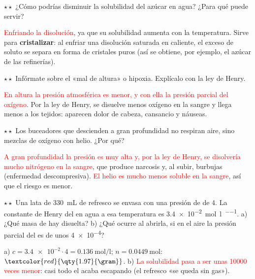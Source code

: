 \begin{exercise}
    \(\star\star\) ¿Cómo podrías disminuir la solubilidad del azúcar en agua? ¿Para qué puede servir?
    \begin{solu}
        \textcolor{red}{Enfriando la disolución}, ya que su solubilidad aumenta con la temperatura. Sirve para \textbf{cristalizar}:
        al enfriar una disolución saturada en caliente, el exceso de soluto se separa en forma de cristales puros (así se obtiene,
        por ejemplo, el azúcar de las refinerías).
    \end{solu}
\end{exercise}

\begin{exercise}
    \(\star\star\) Infórmate sobre el «mal de altura» o hipoxia. Explícalo con la ley de Henry.
    \begin{solu}
        \textcolor{red}{En altura la presión atmosférica es menor, y con ella la presión parcial del oxígeno}. Por la ley de Henry,
        se disuelve menos oxígeno en la sangre y llega menos a los tejidos: aparecen dolor de cabeza, cansancio y náuseas.
    \end{solu}
\end{exercise}

\begin{exercise}
    \(\star\star\) Los buceadores que descienden a gran profundidad no respiran aire, sino mezclas de oxígeno con helio. ¿Por qué?
    \begin{solu}
        \textcolor{red}{A gran profundidad la presión es muy alta y, por la ley de Henry, se disolvería mucho nitrógeno en la
        sangre}, que produce narcosis y, al subir, burbujas (enfermedad descompresiva). \textcolor{red}{El helio es mucho menos
        soluble en la sangre}, así que el riesgo es menor.
    \end{solu}
\end{exercise}

\begin{exercise}
    \(\star\star\) Una lata de \qty{330}{\mL} de refresco se envasa con una presión de  de \qty{4}{\atm}. La constante de
    Henry del  en agua a esa temperatura es \qty{3.4e-2}{\mol\per\litre\per\atm}. a) ¿Qué masa de  hay disuelta?
    b) ¿Qué ocurre al abrirla, si en el aire la presión parcial del  es de unos \qty{4e-4}{\atm}?
    \begin{solu}
        a) \(c = \num{3.4e-2} \cdot 4 = \qty{0.136}{\mol\per\litre}\); \(n = \qty{0.0449}{\mol}\): \(\textcolor{red}{\qty{1.97}{\gram}}\).
        b) \textcolor{red}{La solubilidad pasa a ser unas \num{10000} veces menor}: casi todo el  acaba escapando (el refresco
        «se queda sin gas»).
    \end{solu}
\end{exercise}

